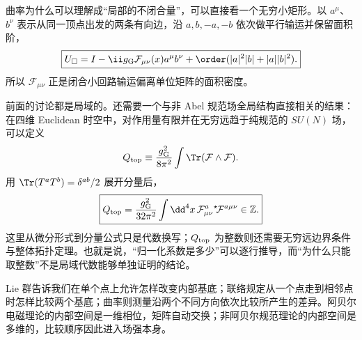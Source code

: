 曲率为什么可以理解成“局部的不闭合量”，可以直接看一个无穷小矩形。以 $a^\mu$、$b^\nu$ 表示从同一顶点出发的两条有向边，沿 $a,b,-a,-b$ 依次做平行输运并保留面积阶，
\begin{equation}
 \boxed{
 U_\square
 =I-\ii g_{\rm G}\mathcal F_{\mu\nu}(x)
 a^\mu b^\nu
 +\order(|a|^2|b|+|a||b|^2).}
 \label{eq:small-loop-curvature-dp11}
\end{equation}
所以 $\mathcal F_{\mu\nu}$ 正是闭合小回路输运偏离单位矩阵的面积密度。

前面的讨论都是局域的。还需要一个与非 Abel 规范场全局结构直接相关的结果：在四维 Euclidean 时空中，对作用量有限并在无穷远趋于纯规范的 $SU(N)$ 场，可以定义
\begin{equation}
 Q_{\rm top}
 \equiv\frac{g_{\rm G}^2}{8\pi^2}\int\Tr(\mathcal F\wedge\mathcal F).
 \label{eq:pontryagin-form-definition-dp68}
\end{equation}
用 $\Tr(T^aT^b)=\delta^{ab}/2$ 展开分量后，
\begin{equation}
 \boxed{
 Q_{\rm top}
 =\frac{g_{\rm G}^2}{32\pi^2}\int\dd^4 x\,
 \mathcal F_{\mu\nu}^a{}^\star\!\mathcal F^{a\mu\nu}
 \in\mathbb Z.}
 \label{eq:pontryagin-number-dp11}
\end{equation}
这里从微分形式到分量公式只是代数换写；$Q_{\rm top}$ 为整数则还需要无穷远边界条件与整体拓扑定理。也就是说，“归一化系数是多少”可以逐行推导，而“为什么只能取整数”不是局域代数能够单独证明的结论。

Lie 群告诉我们在单个点上允许怎样改变内部基底；联络规定从一个点走到相邻点时怎样比较两个基底；曲率则测量沿两个不同方向依次比较所产生的差异。阿贝尔电磁理论的内部空间是一维相位，矩阵自动交换；非阿贝尔规范理论的内部空间是多维的，比较顺序因此进入场强本身。

